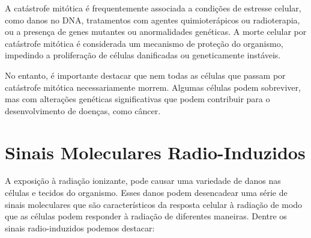 \documentclass[11pt,a4paper]{article}
\begin{document}
\begin{itemize}
			A catástrofe mitótica é frequentemente associada a condições de estresse celular, como danos no DNA, tratamentos com agentes quimioterápicos ou radioterapia, ou a presença de genes mutantes ou anormalidades genéticas. A morte celular por catástrofe mitótica é considerada um mecanismo de proteção do organismo, impedindo a proliferação de células danificadas ou geneticamente instáveis.
			
			No entanto, é importante destacar que nem todas as células que passam por catástrofe mitótica necessariamente morrem. Algumas células podem sobreviver, mas com alterações genéticas significativas que podem contribuir para o desenvolvimento de doenças, como câncer.
		\end{itemize}

	\section{Sinais Moleculares Radio-Induzidos}

		A exposição à radiação ionizante, pode causar uma variedade de danos nas células e tecidos do organismo. Esses danos podem desencadear uma série de sinais moleculares que são característicos da resposta celular à radiação de modo que as células podem responder à radiação de diferentes maneiras. Dentre os sinais radio-induzidos podemos destacar:
\end{document}
